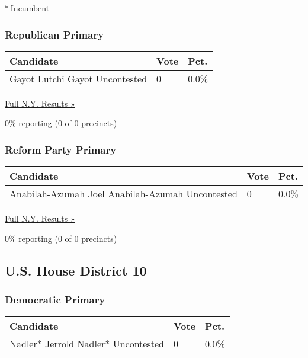 * Incumbent

\hypertarget{republican-primary-5}{%
\subsubsection{Republican Primary}\label{republican-primary-5}}

\begin{longtable}[]{@{}lll@{}}
\toprule
Candidate & Vote & Pct.\tabularnewline
\midrule
\endhead
 Gayot Lutchi Gayot Uncontested & 0 & 0.0\%\tabularnewline
\bottomrule
\end{longtable}

\href{https://www.nytimes3xbfgragh.onion/elections/results/new-york}{Full
N.Y. Results »}

0\% reporting (0 of 0 precincts)

\hypertarget{reform-party-primary-1}{%
\subsubsection{Reform Party Primary}\label{reform-party-primary-1}}

\begin{longtable}[]{@{}lll@{}}
\toprule
Candidate & Vote & Pct.\tabularnewline
\midrule
\endhead
 Anabilah-Azumah Joel Anabilah-Azumah Uncontested & 0 &
0.0\%\tabularnewline
\bottomrule
\end{longtable}

\href{https://www.nytimes3xbfgragh.onion/elections/results/new-york}{Full
N.Y. Results »}

0\% reporting (0 of 0 precincts)

\hypertarget{us-house-district-10}{%
\subsection{U.S. House District 10}\label{us-house-district-10}}

\hypertarget{democratic-primary-10}{%
\subsubsection{Democratic Primary}\label{democratic-primary-10}}

\begin{longtable}[]{@{}lll@{}}
\toprule
Candidate & Vote & Pct.\tabularnewline
\midrule
\endhead
 Nadler* Jerrold Nadler* Uncontested & 0 & 0.0\%\tabularnewline
\bottomrule
\end{longtable}


